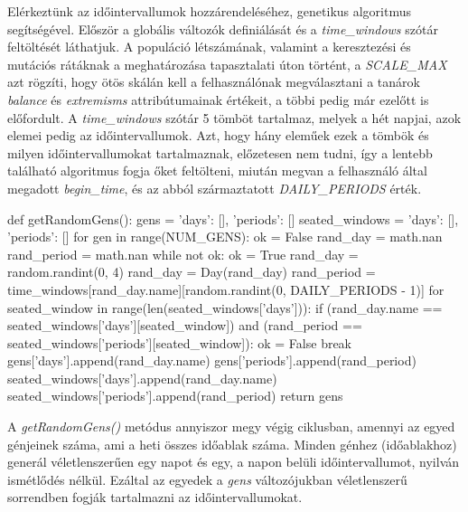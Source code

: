 \documentclass[a4paper,12pt]{article}
\begin{document}
Elérkeztünk az időintervallumok hozzárendeléséhez, genetikus algoritmus segítségével. Először a globális változók definiálását és a \textsl{time_windows} szótár feltöltését láthatjuk. A populáció létszámának, valamint a keresztezési és mutációs rátáknak a meghatározása tapasztalati úton történt, a \textsl{SCALE_MAX} azt rögzíti, hogy ötös skálán kell a felhasználónak megválasztani a tanárok \textsl{balance} és \textsl{extremisms} attribútumainak értékeit, a többi pedig már ezelőtt is előfordult. A \textsl{time_windows} szótár 5 tömböt tartalmaz, melyek a hét napjai, azok elemei pedig az időintervallumok. Azt, hogy hány eleműek ezek a tömbök és milyen időintervallumokat tartalmaznak, előzetesen nem tudni, így a lentebb található algoritmus fogja őket feltölteni, miután megvan a felhasználó által megadott \textsl{begin_time}, és az abból származtatott \textsl{DAILY_PERIODS} érték.

\begin{python}
def getRandomGens():
    gens = {'days': [], 'periods': []}
    seated_windows = {'days': [], 'periods': []}
    for gen in range(NUM_GENS):
        ok = False
        rand_day = math.nan
        rand_period = math.nan
        while not ok:
            ok = True
            rand_day = random.randint(0, 4)
            rand_day = Day(rand_day)
            rand_period = time_windows[rand_day.name][random.randint(0, DAILY_PERIODS - 1)]
            for seated_window in range(len(seated_windows['days'])):
                if (rand_day.name == seated_windows['days'][seated_window]) and (rand_period == seated_windows['periods'][seated_window]):
                    ok = False
                    break
        gens['days'].append(rand_day.name)
        gens['periods'].append(rand_period)
        seated_windows['days'].append(rand_day.name)
        seated_windows['periods'].append(rand_period)
    return gens
\end{python}

A \textsl{getRandomGens()} metódus annyiszor megy végig ciklusban, amennyi az egyed génjeinek száma, ami a heti összes időablak száma. Minden génhez (időablakhoz) generál véletlenszerűen egy napot és egy, a napon belüli időintervallumot, nyilván ismétlődés nélkül. Ezáltal az egyedek a \textsl{gens} változójukban véletlenszerű sorrendben fogják tartalmazni az időintervallumokat.
\end{document}
